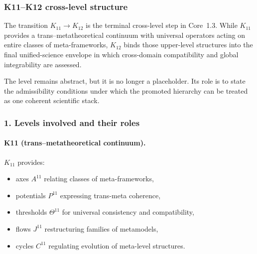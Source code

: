 
\subsubsection{K11–K12 cross-level structure}
\label{sec:crossk-k11-k12}

The transition $K_{11} \rightarrow K_{12}$ is the terminal cross-level step in
Core~1.3. While $K_{11}$ provides a trans–metatheoretical continuum with
universal operators acting on entire classes of meta-frameworks, $K_{12}$
binds those upper-level structures into the final unified-science envelope in
which cross-domain compatibility and global integrability are assessed.

The level remains abstract, but it is no longer a placeholder. Its role is to
state the admissibility conditions under which the promoted hierarchy can be
treated as one coherent scientific stack.

\subsubsection{1. Levels involved and their roles}

\paragraph{K11 (trans–metatheoretical continuum).}
$K_{11}$ provides:
\begin{itemize}
  \item axes $A^{11}$ relating classes of meta-frameworks,
  \item potentials $P^{11}$ expressing trans-meta coherence,
  \item thresholds $\Theta^{11}$ for universal consistency and compatibility,
  \item flows $J^{11}$ restructuring families of metamodels,
  \item cycles $C^{11}$ regulating evolution of meta-level structures.
\end{itemize}

